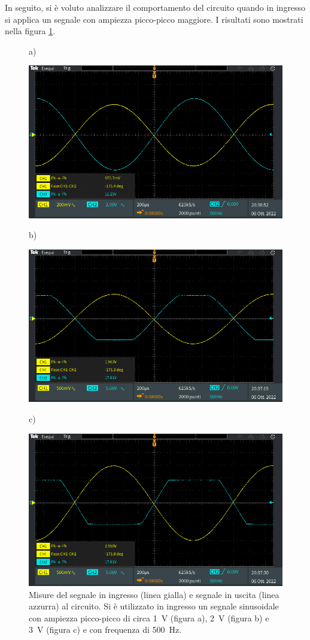 \clearpage
In seguito, si è voluto analizzare il comportamento del circuito quando in ingresso si applica un segnale con ampiezza picco-picco maggiore. I risultati sono mostrati nella figura \ref{fig:misure_oscilloscopio_sat}.
\begin{figure}[h!]
	\centering
	a)
	
	\includegraphics[width=0.8\linewidth]{./ImageFiles/Laboratorio 1/TEK00008}	
\end{figure}
\begin{figure}[h!]
	\centering
	b)
	
	\includegraphics[width=0.8\linewidth]{./ImageFiles/Laboratorio 1/TEK00009}
\end{figure}
\begin{figure}[h!]
	\centering
	c)
	
	\includegraphics[width=0.8\linewidth]{./ImageFiles/Laboratorio 1/TEK00010}
	\caption{Misure del segnale in ingresso (linea gialla) e segnale in uscita (linea azzurra) al circuito. Si è utilizzato in ingresso un segnale sinusoidale con ampiezza picco-picco di circa \SI{1}{\volt} (figura a), \SI{2}{\volt} (figura b) e \SI{3}{\volt} (figura c) e con frequenza di \SI{500}{\hertz}.}
	\label{fig:misure_oscilloscopio_sat}
\end{figure} 

